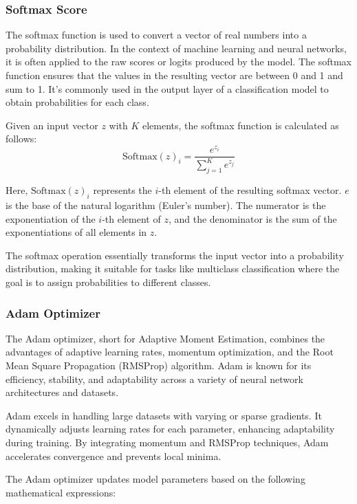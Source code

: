 \subsubsection{Softmax Score}
The softmax function is used to convert a vector of real numbers into a probability distribution. In the context of machine learning and neural networks, it is often applied to the raw scores or logits produced by the model. The softmax function ensures that the values in the resulting vector are between 0 and 1 and sum to 1. It's commonly used in the output layer of a classification model to obtain probabilities for each class.

\noindent Given an input vector \(z\) with \(K\) elements, the softmax function is calculated as follows:
\begin{equation}
    \text{Softmax}(z)_i = \frac{e^{z_i}}{\sum_{j=1}^{K} e^{z_j}} \label{eq:softmax}
\end{equation}


\noindent Here, \(\text{Softmax}(z)_i\) represents the \(i\)-th element of the resulting softmax vector. \(e\) is the base of the natural logarithm (Euler's number). The numerator is the exponentiation of the \(i\)-th element of \(z\), and the denominator is the sum of the exponentiations of all elements in \(z\).

\noindent The softmax operation essentially transforms the input vector into a probability distribution, making it suitable for tasks like multiclass classification where the goal is to assign probabilities to different classes.

\subsubsection{Adam Optimizer}

\noindent The Adam optimizer, short for Adaptive Moment Estimation, combines the advantages of adaptive learning rates, momentum optimization, and the Root Mean Square Propagation (RMSProp) algorithm. Adam is known for its efficiency, stability, and adaptability across a variety of neural network architectures and datasets.

\noindent Adam excels in handling large datasets with varying or sparse gradients. It dynamically adjusts learning rates for each parameter, enhancing adaptability during training. By integrating momentum and RMSProp techniques, Adam accelerates convergence and prevents local minima.

\noindent The Adam optimizer updates model parameters based on the following mathematical expressions:

